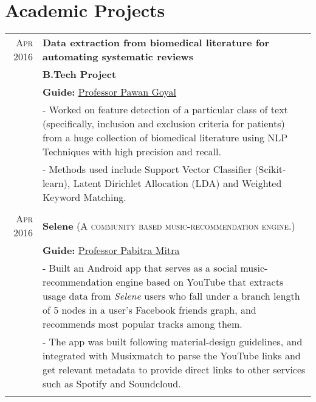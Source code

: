 \documentclass[a4paper,10pt]{extarticle} %
\begin{document}

\section{Academic Projects}

\begin{tabular}{r|p{16cm}}

\textsc{Apr 2016} & \textbf{Data extraction from biomedical literature for automating systematic reviews} \\
& \textbf{B.Tech Project}\\
& \textbf{Guide: }\textmd{\href{http://cse.iitkgp.ac.in/~pawang/}{Professor Pawan Goyal}}\\
& \footnotesize{- Worked on feature detection of a particular class of text (specifically, inclusion and exclusion criteria for patients) from a huge collection of biomedical literature using NLP Techniques with high precision and recall.}\\
& \footnotesize{- Methods used include Support Vector Classifier (Scikit-learn), Latent Dirichlet Allocation (LDA) and Weighted Keyword Matching.}\\
\multicolumn{2}{c}{} \\

\textsc{Apr 2016} & \textbf{Selene} \textsc{(A community based music-recommendation engine.)} \\
& \textbf{Guide: }\textmd{\href{http://cse.iitkgp.ac.in/~pabitra/}{Professor Pabitra Mitra}}\\
& \footnotesize{- Built an Android app that serves as a social music-recommendation engine based on YouTube that extracts usage data from {\itshape{Selene}} users who fall under a branch length of 5 nodes in a user's Facebook friends graph, and recommends most popular tracks among them.}\\
& \footnotesize{- The app was built following material-design guidelines, and integrated with Musixmatch to parse the YouTube links and get relevant metadata to provide direct links to other services such as Spotify and Soundcloud.}\\
\multicolumn{2}{c}{} \\

\end{tabular}
\end{document}
